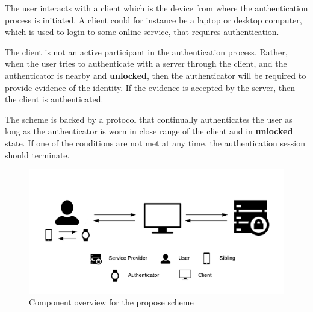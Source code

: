 The user interacts with a \gls{client} which is the device from where the authentication process is initiated. A \gls{client} could for instance be a laptop or desktop computer, which is used to login to some online service, that requires authentication. 

The \gls{client} is not an active participant in the authentication process. Rather, when the user tries to authenticate with a \gls{server} through the \gls{client}, and the \gls{authenticator} is nearby and \textbf{unlocked}, then the \gls{authenticator} will be required to provide evidence of the identity.
If the evidence is accepted by the \gls{server}, then the \gls{client} is authenticated.


The scheme is backed by a protocol that continually authenticates the user as long as the \gls{authenticator} is worn in close range of the \gls{client} and in \textbf{unlocked} state. If one of the conditions are not met at any time, the authentication session should terminate.

\begin{figure}
  \includegraphics[width=\linewidth]{gfx/scheme_diagram.png}
  \caption{Component overview for the propose scheme}
  \label{fig:scheme_diagram}
\end{figure}


